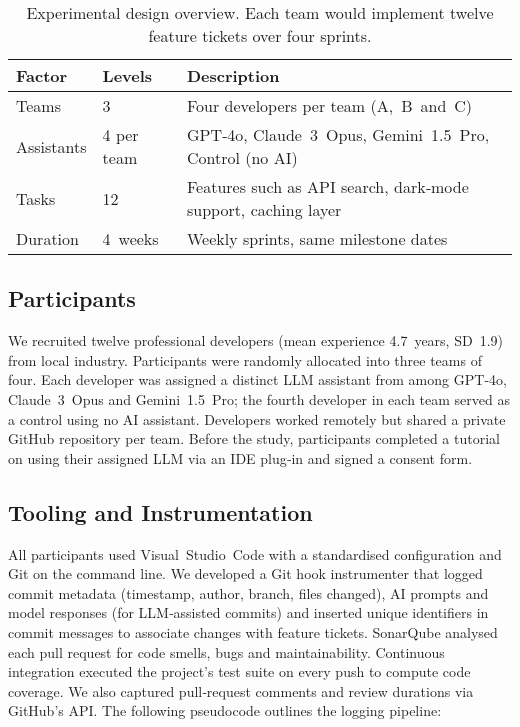 \documentclass[conference]{IEEEtran}
\begin{document}
\begin{table}[t]
\centering
\caption{Experimental design overview.  Each team would implement twelve feature tickets over four sprints.}
\label{tab:design}
\begin{tabular}{p{2.5cm}p{2cm}p{3cm}}
\toprule
\textbf{Factor} & \textbf{Levels} & \textbf{Description}\\
\midrule
Teams & 3 & Four developers per team (A, B and C) \\
Assistants & 4 per team & GPT‑4o, Claude 3 Opus, Gemini 1.5 Pro, Control (no AI) \\
Tasks & 12 & Features such as API search, dark‑mode support, caching layer \\
Duration & 4 weeks & Weekly sprints, same milestone dates \\
\bottomrule
\end{tabular}
\end{table}

\subsection{Participants}
We recruited twelve professional developers (mean experience 4.7 years, SD 1.9) from local industry.  Participants were randomly allocated into three teams of four.  Each developer was assigned a distinct LLM assistant from among GPT‑4o, Claude 3 Opus and Gemini 1.5 Pro; the fourth developer in each team served as a control using no AI assistant.  Developers worked remotely but shared a private GitHub repository per team.  Before the study, participants completed a tutorial on using their assigned LLM via an IDE plug‑in and signed a consent form.

\subsection{Tooling and Instrumentation}
All participants used Visual Studio Code with a standardised configuration and Git on the command line.  We developed a Git hook instrumenter that logged commit metadata (timestamp, author, branch, files changed), AI prompts and model responses (for LLM‑assisted commits) and inserted unique identifiers in commit messages to associate changes with feature tickets.  SonarQube analysed each pull request for code smells, bugs and maintainability.  Continuous integration executed the project’s test suite on every push to compute code coverage.  We also captured pull‑request comments and review durations via GitHub’s API.  The following pseudocode outlines the logging pipeline:
\end{document}
